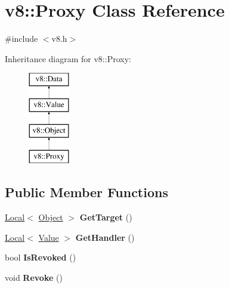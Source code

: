 \hypertarget{classv8_1_1_proxy}{}\section{v8\+:\+:Proxy Class Reference}
\label{classv8_1_1_proxy}


{\ttfamily \#include $<$v8.\+h$>$}

Inheritance diagram for v8\+:\+:Proxy\+:\begin{figure}[H]
\begin{center}
\leavevmode
\includegraphics[height=4.000000cm]{classv8_1_1_proxy}
\end{center}
\end{figure}
\subsection*{Public Member Functions}
\begin{DoxyCompactItemize}
\item 
\hyperlink{classv8_1_1_local}{Local}$<$ \hyperlink{classv8_1_1_object}{Object} $>$ {\bfseries Get\+Target} ()\hypertarget{classv8_1_1_proxy_acfe2ad3df620f6418239c6be170c04db}{}\label{classv8_1_1_proxy_acfe2ad3df620f6418239c6be170c04db}

\item 
\hyperlink{classv8_1_1_local}{Local}$<$ \hyperlink{classv8_1_1_value}{Value} $>$ {\bfseries Get\+Handler} ()\hypertarget{classv8_1_1_proxy_a5343ef97e20c0e61996d194e1a48e0e4}{}\label{classv8_1_1_proxy_a5343ef97e20c0e61996d194e1a48e0e4}

\item 
bool {\bfseries Is\+Revoked} ()\hypertarget{classv8_1_1_proxy_ad6100ff322bd5b0297deea20237ff065}{}\label{classv8_1_1_proxy_ad6100ff322bd5b0297deea20237ff065}

\item 
void {\bfseries Revoke} ()\hypertarget{classv8_1_1_proxy_a24a05c4dc89a74406456df8c14adff7e}{}\label{classv8_1_1_proxy_a24a05c4dc89a74406456df8c14adff7e}

\end{DoxyCompactItemize}

